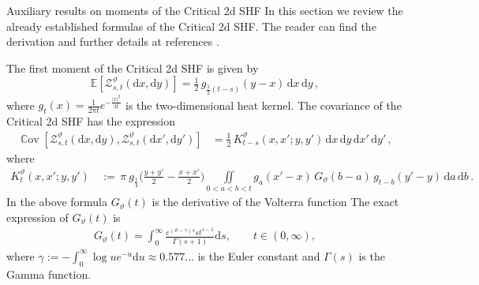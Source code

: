 \documentclass[a4paper,reqno,11pt]{amsart}
\makeatletter
\def\section{\@startsection{section}{1}%
  \z@{.7\linespacing\@plus\linespacing}{.5\linespacing}%
  {\normalfont\large\bfseries\centering}}
\numberwithin{equation}{section}
\theoremstyle{mytheorem}
\newcommand{\bbE}{{\ensuremath{\mathbb E}} }
\DeclareMathOperator{\bbcov}{\ensuremath{\mathbb{C}ov}}
\renewcommand{\theta}{\vartheta}
\newcommand\dd{\mathrm{d}}
\makeatother
\begin{document}
\section{Auxiliary results on moments of the Critical 2d SHF}\label{sec:aux}
In this section we review the already established formulas of the Critical 2d SHF.
The reader can find the derivation and further details at references \cite{CSZ19b, CSZ23a, GQT21}.

The first moment of the Critical 2d SHF is given by
\begin{equation}
	\bbE[\mathscr{Z}^\theta_{s,t}(\dd x, \dd y)]
	= \tfrac{1}{2} \, g_{\frac{1}{2}(t-s)}(y-x) \, \dd x \, \dd y \,,
\end{equation}
where $g_t(x)=\frac{1}{2\pi t}e^{-\frac{|x|^2}{2t}}$ is the two-dimensional heat kernel. 
The covariance of the Critical 2d SHF has the expression
\begin{equation} \label{eq:formula-cov}
\begin{aligned}
	\bbcov[\mathscr{Z}^\theta_{s,t}(\dd x, \dd y), \mathscr{Z}^\theta_{s,t}(\dd x', \dd y')]
	&= \tfrac{1}{2} \, K_{t-s}^\theta(x,x'; y, y') \, \dd x \, \dd y \, \dd x' \, \dd y' \,,
\end{aligned}
\end{equation}
where
\begin{equation}
\label{eq:m2-lim}
\begin{split}
	K_{t}^{\theta}(x,x'; y,y')
	&\,:=\, \pi \: g_{\frac{t}{4}}\big(\tfrac{y+y'}{2} - \tfrac{x+x'}{2}\big)
	\!\!\! \iint\limits_{0<a<b<t} \!\!\! g_a(x'-x) \,
	G_\theta(b-a) \, g_{t-b}(y'-y) \, \dd a \, \dd b \,.
\end{split}
\end{equation}
In the above formula $G_\theta(t)$ is 
the derivative of the Volterra function \cite{A10, CM24}
The exact expression of $G_\theta(t)$  is
\begin{align}\label{eq:Dick}
G_\theta(t)=\int_0^\infty \frac{e^{(\theta-\gamma)s} st^{s-1}}{\Gamma(s+1)} \dd s,
\qquad  t\in (0, \infty), 
\end{align}
where $\gamma:=-\int_0^\infty \log u e^{-u} \dd u \approx 0.577...$ 
is the Euler constant and $\Gamma(s)$ is the Gamma function.
\end{document}

